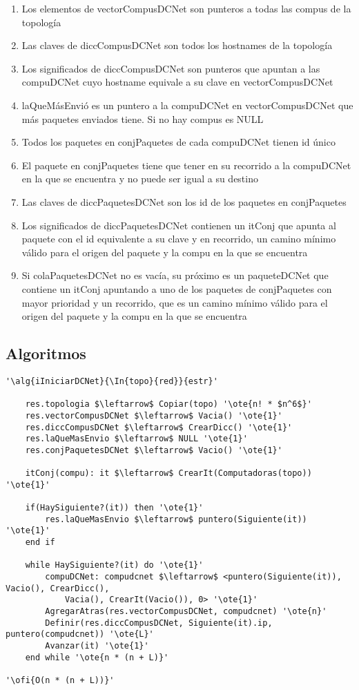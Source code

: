 \begin{enumerate}
	\item Los elementos de vectorCompusDCNet son punteros a todas las compus de
		la topología
	\item Las claves de diccCompusDCNet son todos los hostnames de la topología
	\item Los significados de diccCompusDCNet son punteros que apuntan a las
		compuDCNet cuyo hostname equivale a su clave en vectorCompusDCNet
	\item laQueMásEnvió es un puntero a la compuDCNet en vectorCompusDCNet que
		más paquetes enviados tiene. Si no hay compus es NULL
	\item Todos los paquetes en conjPaquetes de cada compuDCNet tienen id único
	\item El paquete en conjPaquetes tiene que tener en su recorrido a la
		compuDCNet en la que se encuentra y no puede ser igual a su destino
	\item Las claves de diccPaquetesDCNet son los id de los paquetes en
		conjPaquetes 
	\item Los significados de diccPaquetesDCNet contienen un itConj que apunta al
		paquete con el id equivalente a su clave y en recorrido, un camino
		mínimo válido para el origen del paquete y la compu en la que se
		encuentra
	\item Si colaPaquetesDCNet no es vacía, su próximo es un paqueteDCNet que
		contiene un itConj apuntando a uno de los paquetes de conjPaquetes con
		mayor prioridad y un recorrido, que es un camino mínimo válido para el
		origen del paquete y la compu en la que se encuentra
\end{enumerate}

\subsection{Algoritmos}

\lstset{style=alg}

\begin{lstlisting}[mathescape]
'\alg{iIniciarDCNet}{\In{topo}{red}}{estr}'
	
    res.topologia $\leftarrow$ Copiar(topo) '\ote{n! * $n^6$}'
    res.vectorCompusDCNet $\leftarrow$ Vacia() '\ote{1}'
    res.diccCompusDCNet $\leftarrow$ CrearDicc() '\ote{1}'
    res.laQueMasEnvio $\leftarrow$ NULL '\ote{1}'
    res.conjPaquetesDCNet $\leftarrow$ Vacio() '\ote{1}'

    itConj(compu): it $\leftarrow$ CrearIt(Computadoras(topo)) '\ote{1}'

    if(HaySiguiente?(it)) then '\ote{1}'
    	res.laQueMasEnvio $\leftarrow$ puntero(Siguiente(it)) '\ote{1}'
    end if

    while HaySiguiente?(it) do '\ote{1}'
    	compuDCNet: compudcnet $\leftarrow$ <puntero(Siguiente(it)), Vacio(), CrearDicc(),
    		Vacia(), CrearIt(Vacio()), 0> '\ote{1}'
    	AgregarAtras(res.vectorCompusDCNet, compudcnet) '\ote{n}'
    	Definir(res.diccCompusDCNet, Siguiente(it).ip, puntero(compudcnet)) '\ote{L}'
    	Avanzar(it) '\ote{1}'
    end while '\ote{n * (n + L)}'

'\ofi{O(n * (n + L))}'
\end{lstlisting}

